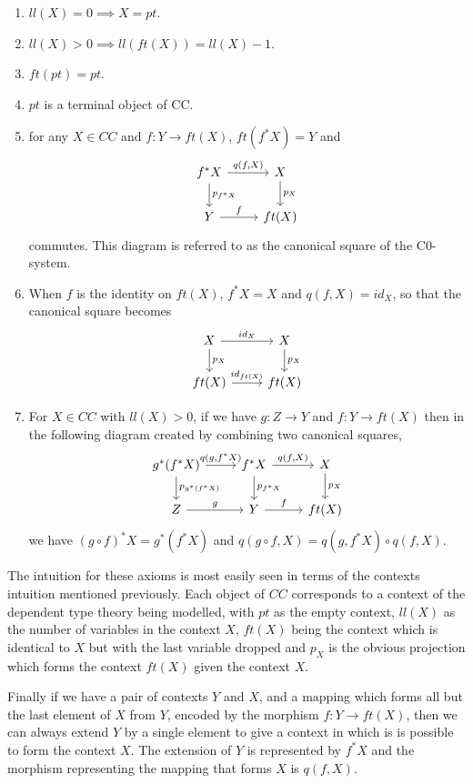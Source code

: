 \begin{enumerate}
    \item $ll(X) = 0 \implies X=pt$.
    \item $ll(X) > 0 \implies ll(ft(X)) = ll(X) - 1$.
    \item $ft(pt) = pt$.
    \item $pt$ is a terminal object of CC.
    \item for any $X\in CC$ and $f: Y\to ft(X)$, $ft(f^*X)=Y$ and
    \[
    \begin{tikzcd}
        f^*X\ar[r,"{q(f,X)}"]\ar[d,"p_{f^*X}"]&X\ar[d,"p_X"] \\
        Y\ar[r,"f"]&ft(X)
    \end{tikzcd}
    \]
    commutes. This diagram is referred to as the canonical square of the
    C0-system.
    \item When $f$ is the identity on $ft(X)$, $f^*X = X$ and $q(f, X) = id_X$,
    so that the canonical square becomes
    \[
    \begin{tikzcd}
        X\ar[r,"id_X"]\ar[d,"p_X"]&X\ar[d,"p_X"] \\
        ft(X)\ar[r,"id_{ft(X)}"]&ft(X)
    \end{tikzcd}
    \]
    \item For $X\in CC$ with $ll(X)>0$, if we have $g:Z\to Y$ and $f:Y\to ft(X)$
    then in the following diagram created by combining two canonical squares,
    \[
    \begin{tikzcd}
        g^*(f^*X)\ar[r,"{q(g, f^*X)}"]\ar[d,"p_{g^*(f^*X)}"]&
        f^*X\ar[r,"{q(f,X)}"]\ar[d,"p_{f^*X}"]&
        X\ar[d,"p_X"] \\
        Z\ar[r,"g"]&
        Y\ar[r,"f"]&
        ft(X)
    \end{tikzcd}
    \]
    we have $(g\circ f)^*X = g^*(f^*X)$ and $q(g\circ f, X) = q(g, f^*X)\circ
    q(f, X)$.
\end{enumerate}

The intuition for these axioms is most easily seen in terms of the contexts
intuition mentioned previously. Each object of $CC$ corresponds to a context of
the dependent type theory being modelled, with $pt$ as the empty context,
$ll(X)$ as the number of variables in the context $X$, $ft(X)$ being the context
which is identical to $X$ but with the last variable dropped and $p_X$ is the
obvious projection which forms the context $ft(X)$ given the context $X$.

Finally if we have a pair of contexts $Y$ and $X$, and a mapping which forms all
but the last element of $X$ from $Y$, encoded by the morphism $f: Y\to ft(X)$,
then we can always extend $Y$ by a single element to give a context in which is
is possible to form the context $X$. The extension of $Y$ is represented by
$f^*X$ and the morphism representing the mapping that forms $X$ is $q(f, X)$.

